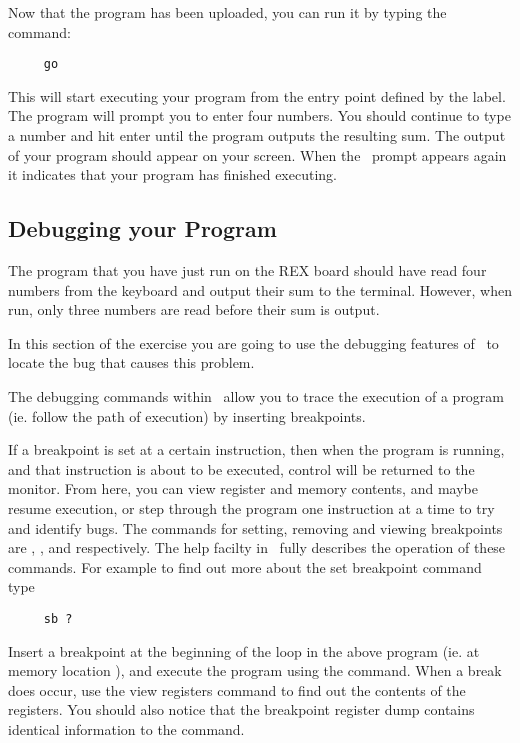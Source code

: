 Now that the program has been uploaded, you can run it by typing the command:
\begin{verbatim}
     go
\end{verbatim}

This will start executing your program from the entry point defined by the 
 label. The program will
prompt you to enter four numbers. You should continue to type a number and 
hit enter until the program
outputs the resulting sum. The output of your program should appear on your 
screen. When the \WRAMPmon\
prompt appears again it indicates that your program has finished executing.


\subsection{Debugging your Program}
The program that you have just run on the REX board should have read four 
numbers from the keyboard and
output their sum to the terminal. However, when run, only three numbers
are read before their sum is output.

In this section of the exercise you are going to use the debugging 
features of \WRAMPmon\ to locate the bug that
causes this problem.

The debugging commands within \WRAMPmon\ allow you to trace the execution 
of a program (ie. follow the path
of execution) by inserting breakpoints.

If a breakpoint is set at a certain instruction, then when the program
is running, and that instruction is about to be executed, control will
be returned to the monitor. From here, you can view register and
memory contents, and maybe resume execution, or step through the
program one instruction at a time to try and identify bugs.  The
commands for setting, removing and viewing breakpoints are ,
\src{rb}, and \src{vb} respectively. The help facilty in \WRAMPmon\
fully describes the operation of these commands. For example to find
out more about the set breakpoint command type
\begin{verbatim}
     sb ?
\end{verbatim}

Insert a breakpoint at the beginning of the loop in the above program 
(ie. at memory location ), and
execute the program using the \src{go} command.
When a break does occur, use the view registers command to find out the 
contents of the registers. You should also notice that the breakpoint 
register dump contains identical information
to the \src{vr} command.

